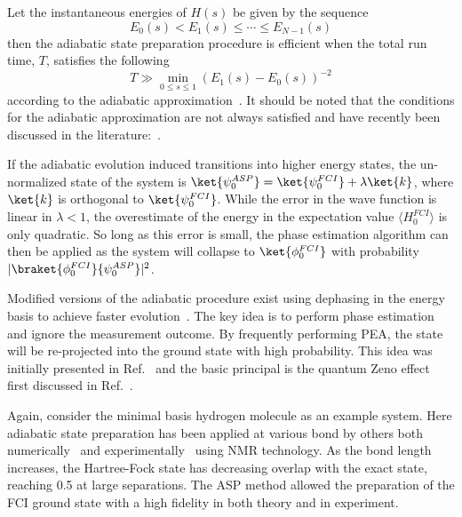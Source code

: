 \documentclass[11pt,oneside,final]{huthesis}%
\begin{document}
Let the instantaneous energies of $H(s)$ be given by the sequence
\begin{equation}
E_0(s)< E_1(s)\leq\cdots\leq E_{N-1}(s)
\end{equation}
then the adiabatic state preparation procedure is efficient when the total run
time, $T$, satisfies the following
\begin{equation}
T\gg\min_{0\leq s\leq 1} \left(E_1(s)-E_0(s)\right)^{-2}
\end{equation}
according to the adiabatic approximation~\cite{Messiah99}. It should be noted that the conditions for the adiabatic approximation are not always satisfied and have recently been discussed in the literature:~\cite{Amin09B,Tong07,Tong10,Boixo10}.

If the adiabatic evolution induced transitions into higher energy states, the un-normalized state of the system is $\ket{\psi_0^{ASP}}=\ket{\psi_0^{FCI}}+\lambda\ket{k}$, where $\ket{k}$ is orthogonal to $ \ket{\psi_0^{FCI}}$. While the error in the wave function is linear in $\lambda<1$, the overestimate of the energy in the expectation value $\langle {H}_0^{FCI}\rangle$ is only quadratic.
So long as this error is small, the phase estimation algorithm can then be applied as the system will collapse to $\ket{\phi_0^{FCI}}$ with probability $|\braket{\phi_0^{FCI}}{\psi_0^{ASP}}|^2$.

Modified versions of the adiabatic procedure exist using dephasing in the energy basis to achieve faster evolution~\cite{Boixo09,Wocjan08}.  The key idea is to perform phase estimation and ignore the measurement outcome.  By frequently performing PEA, the state will be re-projected into the ground state with high probability.  This idea was initially presented in Ref.~\cite{Aharonov08} and the basic principal is the quantum Zeno effect first discussed in Ref.~\cite{Misra77}.

Again, consider the minimal basis hydrogen molecule as an example system.  Here adiabatic state preparation  has been applied at various bond by others both numerically~\cite{Aspuru05} and experimentally~\cite{Du10} using NMR technology.  As the bond length increases, the Hartree-Fock state has decreasing overlap with the exact state, reaching 0.5 at large separations. The ASP method allowed the preparation of the FCI ground state with a high fidelity in both theory and in experiment.


\end{document}
